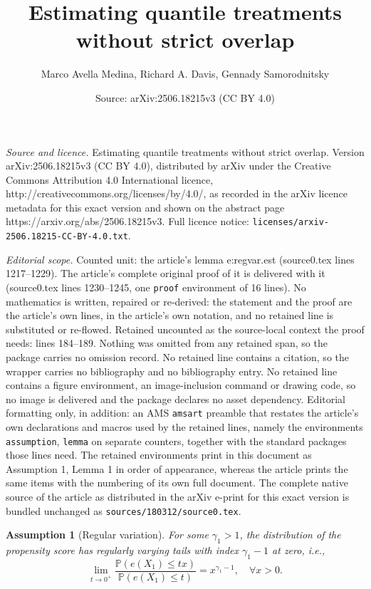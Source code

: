 \documentclass[10pt,a4paper]{amsart}
\title{Estimating quantile treatments without strict overlap}
\author{Marco Avella Medina, Richard A. Davis, Gennady Samorodnitsky}
\date{Source: arXiv:2506.18215v3 (CC BY 4.0)}
\newtheorem{assumption}{Assumption}
\newcommand{\bbP}{\mathbb{P}}
\begin{document}
\maketitle

\noindent\emph{Source and licence.} Estimating quantile treatments without strict overlap. Version arXiv:2506.18215v3 (CC BY 4.0), distributed by arXiv under the Creative Commons Attribution 4.0 International licence, http://creativecommons.org/licenses/by/4.0/, as recorded in the arXiv licence metadata for this exact version and shown on the abstract page https://arxiv.org/abs/2506.18215v3. Full licence notice: \texttt{licenses/arxiv-2506.18215-CC-BY-4.0.txt}.\par\smallskip

\noindent\textit{Editorial scope.} Counted unit: the article's lemma e:regvar.est (source0.tex lines 1217--1229). The article's complete original proof of it is delivered with it (source0.tex lines 1230--1245, one \texttt{proof} environment of 16 lines). No mathematics is written, repaired or re-derived: the statement and the proof are the article's own lines, in the article's own notation, and no retained line is substituted or re-flowed.  Retained uncounted as the source-local context the proof needs: lines 184--189.  Nothing was omitted from any retained span, so the package carries no omission record.  No retained line contains a citation, so the wrapper carries no bibliography and no bibliography entry.  No retained line contains a figure environment, an image-inclusion command or drawing code, so no image is delivered and the package declares no asset dependency.  Editorial formatting only, in addition: an AMS \texttt{amsart} preamble that restates the article's own declarations and macros used by the retained lines, namely the environments \texttt{assumption}, \texttt{lemma} on separate counters, together with the standard packages those lines need.  The retained environments print in this document as Assumption 1, Lemma 1 in order of appearance, whereas the article prints the same items with the numbering of its own full document.  The complete native source of the article as distributed in the arXiv e-print for this exact version is bundled unchanged as \texttt{sources/180312/source0.tex}.
\begin{assumption}[Regular variation]\label{ass:RV_prop_score}
    For some $\gamma_1>1$, the distribution of the propensity score has regularly varying tails with index $\gamma_1-1$ at zero, i.e.,
    \begin{equation*}
        \lim_{t\to 0^+}\frac{\bbP(e(X_1)\leq t x)}{\bbP(e(X_1)\leq t)}=x^{\gamma_1-1}, \quad \forall x>0.
    \end{equation*}
\end{assumption}
\end{document}
